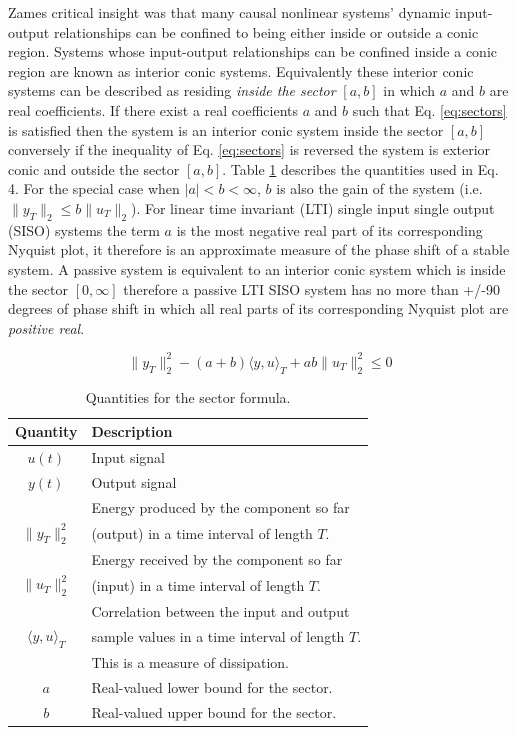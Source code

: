 Zames critical insight was that many causal nonlinear systems' dynamic input-output relationships 
can be confined to being either inside or outside a conic region. Systems whose input-output 
relationships can be confined inside a conic region are known as interior conic systems. Equivalently 
these interior conic systems can be described as residing {\em inside the sector} $[a,b]$ in 
which $a$ and $b$ are
real coefficients\cite{control:sectors1}. If there exist a real coefficients $a$ and $b$ such that 
Eq. \ref{eq:sectors} is satisfied then the system is an interior conic system inside the sector 
$[a,b]$ conversely if the inequality of Eq. \ref{eq:sectors} is reversed the system is exterior 
conic and outside the sector $[a,b]$. Table \ref{tab:quantities} describes the quantities
used in Eq. 4. For the special case when $|a| < b < \infty$, $b$ is also the gain of the system 
(i.e. $\lVert y_T \rVert_2 \leq b \lVert u_T \rVert_2$). For linear time invariant (LTI) single input single 
output (SISO) systems the term $a$ is the most negative real part of its corresponding Nyquist 
plot, it therefore is an approximate measure of the phase shift of a stable system. A passive 
system is equivalent to an interior conic system which is inside the sector $[0,\infty]$ 
therefore a passive LTI SISO system has no more than +/-90 degrees of phase shift in which all 
real parts of its corresponding Nyquist plot are {\em positive real}.

\begin{equation} 
\lVert y_T \rVert^2_2 - (a+b) \langle y,u \rangle_T + ab \lVert u_T \rVert^2_2 \leq 0
\label{eq:sectors}
\end{equation}

\begin{table}[htb]
\centering
\begin{tabular}[width=0.9\columnwidth]{@{\extracolsep{\fill}}  | c | l | }
\hline
\textbf{Quantity} & \textbf{Description} \\
\hline \hline
$u(t)$ & Input signal \\
\hline
$y(t)$ & Output signal \\
\hline
 & Energy produced by the component so far \\
$\lVert y_T \rVert^2_2$ & (output) in a time interval of length $T$. \\
\hline
 & Energy received by the component so far \\
$\lVert u_T \rVert^2_2$ & (input) in a time interval of length $T$. \\
\hline
 & Correlation between the input and output \\ 
$\langle y,u \rangle_T$ & sample values in a time interval of length $T$. \\
 & This is a measure of dissipation. \\
\hline
$a$ & Real-valued lower bound for the sector. \\
\hline
$b$ & Real-valued upper bound for the sector. \\
\hline
\end{tabular}
\caption{ Quantities for the sector formula.}
\label{tab:quantities}
\end{table}

